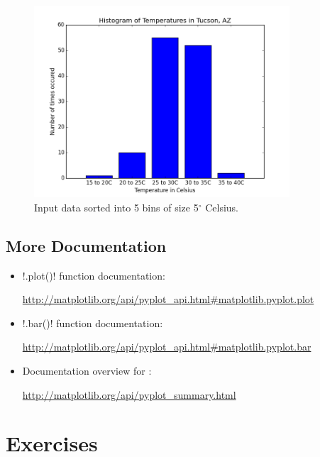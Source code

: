 \documentclass[11pt]{cselabheader}
\begin{document}
\begin{figure}[h]
  \centering
  \includegraphics[width=0.85\textwidth]{img/lab6_histo_tucson.png}
  \caption{Input data sorted into 5 bins of size 5$^\circ$ Celsius.}
  \label{fig:bar1}
\end{figure}

\subsection{More Documentation}

\begin{itemize}
  \item \pythoninline!.plot()! function documentation:
    \begin{center}
      \url{http://matplotlib.org/api/pyplot\_api.html#matplotlib.pyplot.plot}
    \end{center}
  \item \pythoninline!.bar()! function documentation:
    \begin{center}
      \url{http://matplotlib.org/api/pyplot\_api.html#matplotlib.pyplot.bar}
    \end{center}
  \item Documentation overview for :
    \begin{center}
      \url{http://matplotlib.org/api/pyplot\_summary.html}
    \end{center}
\end{itemize}

\pagebreak
\section{Exercises}
\label{sec:ex}
\end{document}
